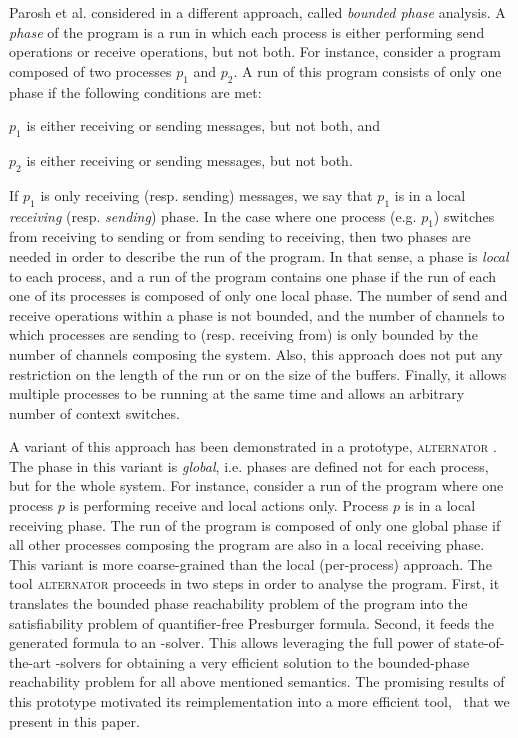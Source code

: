 Parosh et al. considered in \cite{AAC13} a different approach, called \textit{bounded phase} analysis.
%
A \textit{phase} of the program is a run in which each process 
is either performing send operations or receive operations, but not both.
%
For instance, consider a program composed of two processes $p_1$ and $p_2$.
A run of this program consists of only one phase if the following conditions are met:
\begin{inparaenum}[i)]
\item $p_1$ is either receiving or sending messages, but not both, and
\item $p_2$ is either receiving or sending messages, but not both.
\end{inparaenum}
%
If $p_1$ is only receiving (resp. sending) messages, we say that $p_1$ is in a local \textit{receiving} (resp. \textit{sending}) phase.
%
In the case where one process (e.g. $p_1$) switches from receiving to sending or from sending to receiving,
then two phases are needed in order to describe the run of the program.
%
In that sense, a phase is \textit{local} to each process,
and a run of the program contains one phase
if the run of each one of its processes is composed of only one local phase.
%
The number of send and receive operations within a phase is not bounded,
and the number of channels to which processes are sending to (resp. receiving from)
is only bounded by the number of channels composing the system.
%
Also, this approach does not put any restriction on the length of the
run or on the size of the buffers.
%
Finally, it allows multiple processes to be running at the same time and allows an arbitrary number of context switches.

A variant of this approach has been demonstrated in a prototype, \textsc{alternator} \cite{github.alternator}.
%
The phase in this variant is \textit{global}, i.e. phases are defined not for each process, but for the whole system.
%
For instance, consider a run of the program where one process $p$ is performing receive and local actions only.
Process $p$ is in a local receiving phase.
The run of the program is composed of only one global phase if all other processes composing the program are also in a local receiving phase.
%
This variant is more coarse-grained than the local (per-process) approach.
%
The tool \textsc{alternator} proceeds in two steps in order to analyse the program.
%
First, it translates the bounded phase reachability problem of the program into the satisfiability problem of quantifier-free Presburger formula.
Second, it feeds the generated formula to an \Smt-solver.
%
This allows leveraging the full power of state-of-the-art
\Smt-solvers for obtaining a very efficient solution to the bounded-phase reachability problem for all above mentioned semantics. 
%
%
The promising results of this prototype motivated its reimplementation into a more efficient tool, \MPass\, that we present in this paper.

